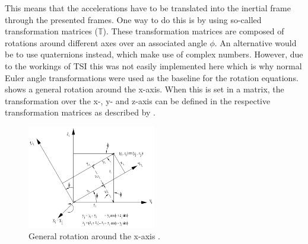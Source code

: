 
\noindent
This means that the accelerations have to be translated into the inertial frame through the presented frames. One way to do this is by using so-called transformation matrices ($\mathbb{T}$). These transformation matrices are composed of rotations around different axes over an associated angle $\phi$. An alternative would be to use quaternions instead, which make use of complex numbers. However, due to the workings of \ac{TSI} this was not easily implemented here which is why normal Euler angle transformations were used as the baseline for the rotation equations.   shows a general rotation around the x-axis. When this is set in a matrix, the transformation over the x-, y- and z-axis can be defined in the respective transformation matrices as described by . 


\begin{figure}[!ht]
\centering
\includegraphics[width=0.5\textwidth]{figures/reference_frames/xtrans_mooij2013stat.jpg}
\caption{General rotation around the x-axis \citep{mooij2013stat}.}
\label{fig:exampleXtrans_mooij2013stat}
\end{figure}


